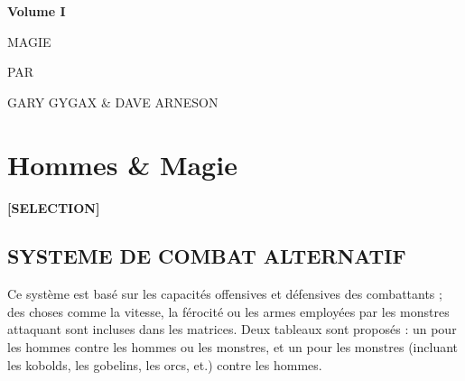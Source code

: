 \newpage
{}\begin{center}
{\Huge {}}{\normalsize \textsuperscript{\sffamily\textregistered}}

\vspace{1.8cm}

{\Large \textbf{Volume I}}

\vspace{1.3cm}

{\Huge {} MAGIE}

\vspace{5cm}

{\large PAR

\vspace{0.1cm}

GARY GYGAX \& DAVE ARNESON}
\end{center}

\newpage

\section*{Hommes \& Magie}

\begin{center}
\textbf{[SELECTION]}
\end{center}

\subsection*{SYSTEME DE COMBAT ALTERNATIF}

Ce système est basé sur les capacités offensives et défensives des combattants ; des choses comme la vitesse, la férocité ou les armes employées par les monstres attaquant sont incluses dans les matrices. Deux tableaux sont proposés : un pour les hommes contre les hommes ou les monstres, et un pour les monstres (incluant les kobolds, les gobelins, les orcs, et.) contre les hommes.

